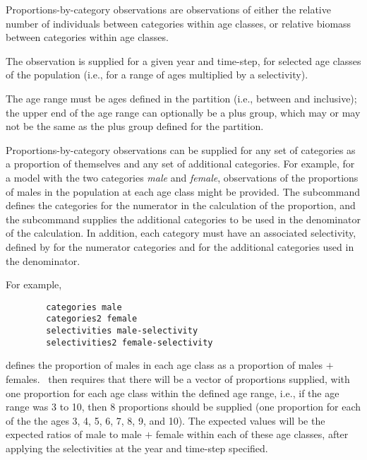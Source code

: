 
Proportions-by-category observations are observations of either the relative number of individuals between categories within age classes, or relative biomass between categories within age classes.

The observation is supplied for a given year and time-step, for selected age classes of the population (i.e., for a range of ages multiplied by a selectivity).

The age range must be ages defined in the partition (i.e., between  and  inclusive); the upper end of the age range can optionally be a plus group, which may or may not be the same as the plus group defined for the partition.

Proportions-by-category observations can be supplied for any set of categories as a proportion of themselves and any set of additional categories. For example, for a model with the two categories \emph{male} and \emph{female}, observations of the proportions of males in the population at each age class might be provided. The subcommand  defines the categories for the numerator in the calculation of the proportion, and the subcommand  supplies the additional categories to be used in the denominator of the calculation. In addition, each category must have an associated selectivity, defined by  for the numerator categories and  for the additional categories used in the denominator.

For example,

{\small{\begin{verbatim}
		categories male
		categories2 female
		selectivities male-selectivity
		selectivities2 female-selectivity
		\end{verbatim}}}

defines the proportion of males in each age class as a proportion of males $+$ females. \CNAME\ then requires that there will be a vector of proportions supplied, with one proportion for each age class within the defined age range, i.e., if the age range was 3 to 10, then 8 proportions should be supplied (one proportion for each of the the ages 3, 4, 5, 6, 7, 8, 9, and 10). The expected values will be the expected ratios of male to male $+$ female within each of these age classes, after applying the selectivities at the year and time-step specified.

